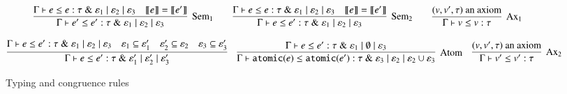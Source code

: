 \documentclass[nocopyrightspace,preprint]{sigplanconf}
\newcommand{\keywd}[1]{\mathtt{#1}}
\newcommand{\myatomic}[1]{\keywd{atomic}(#1)}
\newcommand{\eff}{\varepsilon}
\newcommand{\sem}[1]{\ensuremath{\llbracket {#1} \rrbracket}}
\newcommand{\myety}[4]{{#1}\mathrel{\&}{#2} \mid #3 \mid #4}
\begin{document}
\begin{figure*}[t]
 \[
  \infer[\textrm{Sem}_1]{\Gamma \vdash e' \leq e' : \myety{\tau}{\eff_1}{\eff_2}{\eff_3}}{\Gamma \vdash e \leq e : \myety{\tau}{\eff_1}{\eff_2}{\eff_3} \quad \sem{e} = \sem{e'}}
  \qquad
  \infer[\textrm{Sem}_2]{\Gamma \vdash e \leq e' : \myety{\tau}{\eff_1}{\eff_2}{\eff_3}}{\Gamma \vdash e \leq e : \myety{\tau}{\eff_1}{\eff_2}{\eff_3} \quad \sem{e} = \sem{e'}}
\qquad 
\infer[\textrm{Ax}_1]{\Gamma\vdash v\leq v:\tau}{(v,v',\tau)\mbox{ an axiom}}
\]

\[ \infer{\Gamma\vdash e\leq e':\myety{\tau}{\eff_1'}{\eff_2'}{\eff_3'}}{\Gamma\vdash
  e\leq e':\myety{\tau}{\eff_1}{\eff_2}{\eff_3} & \eff_1
  \subseteq  \eff_1' & \eff_2' \subseteq  \eff_2 & \eff_3
  \subseteq  \eff_3'}
\quad 
\infer[\textrm{Atom}]{\Gamma\vdash\myatomic{e}\leq\myatomic{e'}:\myety{\tau}{\eff_3}{\eff_2}{\eff_2\cup\eff_3}}{\Gamma\vdash e\leq e':\myety{\tau}{\eff_1}{\emptyset}{\eff_3}} \quad 
\infer[\textrm{Ax}_2]{\Gamma\vdash v'\leq v':\tau}{(v,v',\tau)\mbox{ an axiom}}
\]
\vspace{-2mm}
\label{tycrule}
\caption{Typing and congruence rules}
\vspace{-4mm}
\end{figure*}
\end{document}
